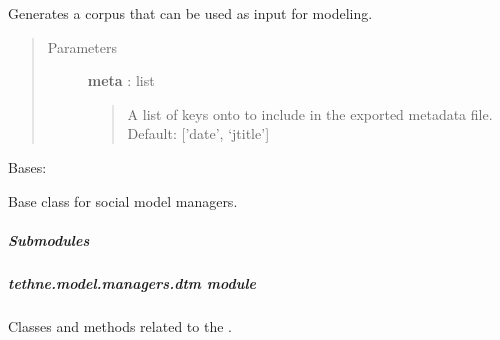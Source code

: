 \documentclass[letterpaper,10pt,english]{sphinxmanual}
\begin{document}
\begin{fulllineitems}
\begin{fulllineitems}
\label{tethne.model.managers:tethne.model.managers.ModelManager.prep}
Generates a corpus that can be used as input for modeling.
\begin{quote}\begin{description}
\item[{Parameters}] \leavevmode
\textbf{meta} : list
\begin{quote}

A list of keys onto {\hyperref[tethne.classes.paper:tethne.classes.paper.Paper]{}} to include in the exported
metadata file. Default: {[}'date', `jtitle'{]}
\end{quote}

\end{description}\end{quote}

\end{fulllineitems}


\end{fulllineitems}


\begin{fulllineitems}
\label{tethne.model.managers:tethne.model.managers.SocialModelManager}
Bases: 

Base class for social model managers.

\begin{fulllineitems}
\label{tethne.model.managers:tethne.model.managers.SocialModelManager.build}
\end{fulllineitems}


\end{fulllineitems}



\subparagraph{Submodules}
\label{tethne.model.managers:submodules}

\subparagraph{tethne.model.managers.dtm module}
\label{tethne.model.managers.dtm:module-tethne.model.managers.dtm}\label{tethne.model.managers.dtm::doc}\label{tethne.model.managers.dtm:tethne-model-managers-dtm-module}
Classes and methods related to the {\hyperref[tethne.model.managers.dtm:tethne.model.managers.dtm.DTMModelManager]{}}.
\end{document}
